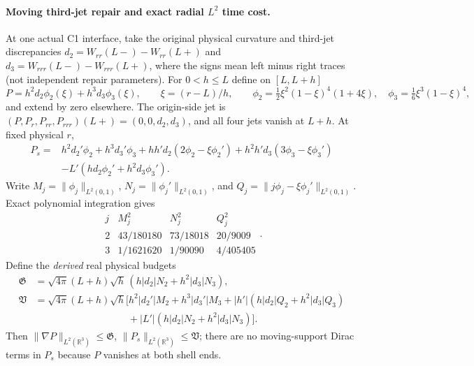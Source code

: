 \paragraph{Moving third-jet repair and exact radial \(L^2\) time cost.}
At one actual C1 interface, take the original physical curvature
and third-jet discrepancies
$d_2=W_{rr}(L-)-W_{rr}(L+)$ and
$d_3=W_{rrr}(L-)-W_{rrr}(L+)$,
where the signs mean left minus right traces (not independent
repair parameters).
For $0<h\le L$ define on $[L,L+h]$
\[
 P=h^2d_2\phi_2(\xi)+h^3d_3\phi_3(\xi),\qquad
 \xi=(r-L)/h,\qquad
 \phi_2=\tfrac12\xi^2(1-\xi)^4(1+4\xi),\quad
 \phi_3=\tfrac16\xi^3(1-\xi)^4,
\]
and extend by zero elsewhere. The origin-side jet is
$(P,P_r,P_{rr},P_{rrr})(L+)=(0,0,d_2,d_3)$,
and all four jets vanish at $L+h$. At fixed physical $r$,
\[
\begin{aligned}
 P_s={}&h^2d_2'\phi_2+h^3d_3'\phi_3
 +hh'd_2(2\phi_2-\xi\phi_2')
 +h^2h'd_3(3\phi_3-\xi\phi_3')\\
 &-L'(hd_2\phi_2'+h^2d_3\phi_3').
\end{aligned}
\]
Write $M_j=\|\phi_j\|_{L^2(0,1)}$,
$N_j=\|\phi_j'\|_{L^2(0,1)}$, and
$Q_j=\|j\phi_j-\xi\phi_j'\|_{L^2(0,1)}$.
Exact polynomial integration gives
\[
\begin{array}{c|ccc}
j&M_j^2&N_j^2&Q_j^2\\\hline
2&43/180180&73/18018&20/9009\\
3&1/1621620&1/90090&4/405405
\end{array}.
\]
Define the \emph{derived} real physical budgets
\[
\begin{aligned}
\mathfrak G&=\sqrt{4\pi}(L+h)\sqrt h\,
   (h|d_2|N_2+h^2|d_3|N_3),\\
\mathfrak V&=\sqrt{4\pi}(L+h)\sqrt h\big[
 h^2|d_2'|M_2+h^3|d_3'|M_3+
 |h'|(h|d_2|Q_2+h^2|d_3|Q_3)\\
 &\hspace{4cm}+|L'|(h|d_2|N_2+h^2|d_3|N_3)\big].
\end{aligned}
\]
Then $\|\nabla P\|_{L^2(\mathbb R^3)}\le\mathfrak G$,
$\|P_s\|_{L^2(\mathbb R^3)}\le\mathfrak V$;
there are no moving-support Dirac terms in $P_s$ because
$P$ vanishes at both shell ends.

